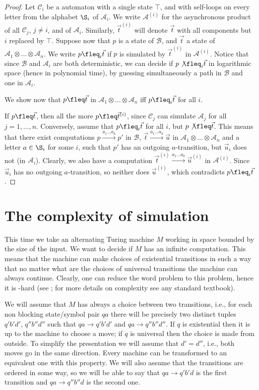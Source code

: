 \documentclass{LMCS}
\theoremstyle{plain}\newtheorem{remark}{Remark}
\theoremstyle{plain}\newtheorem{lemma}[thm]{Lemma}
\renewcommand{\Aa}{\mathcal{A}}
\renewcommand{\Bb}{\mathcal{B}}
\renewcommand{\Cc}{\mathcal{C}}
\newcommand{\vect}{\vec t}
\newcommand{\vecu}{\vec u}
\newcommand{\vAa}{\Aa_1\otimes\dots\otimes\Aa_n}
\newcommand{\trans}[1]{\stackrel{#1}{\longrightarrow}}
\begin{document}
\begin{proof}
  Let $\Cc_i$ be a automaton with a single state $\top$, and with
  self-loops on every letter from the alphabet $\S_i$ of $\Aa_i$. We
  write $\Aa^{(i)}$ for the asynchronous product of all $\Cc_j$, $j
  \not= i$, and of $\Aa_i$. Similarly, $\vect^{(i)}$ will denote $\vect$
with all components but $i$ replaced by $\top$.  Suppose now that $p$
is a state of $\Bb$, and $\vect$ a state of $\vAa$.  We write $p
\fleq_i \vect$ if $p$ is simulated by $\vect^{(i)}$ in $\Aa^{(i)}$.
 Notice that since $\Bb$ and $\Aa_i$ are both deterministic,
we can decide if $p \not\fleq_i \vect$ in logarithmic space (hence in
polynomial time), by guessing simultaneously a path in $\Bb$ and one
in $\Aa_i$.

  We show now that $p \fleq \vect$ in $\vAa$ iff $p \fleq_i \vect$ for
  all $i$.

  If $p \fleq \vect$, then all the more $p \fleq
  \vect^{(i)}$, since $\Cc_j$ can simulate $\Aa_j$ for all $j=1,\dots,n$.
  Conversely, assume that $p \fleq_i \vect$
  for all $i$, but  $p \not\fleq \vect$. This means that
  there exist computations $p \trans{a_1\ldots a_k} p'$ in $\Bb$,
  $\vect \trans{a_1\ldots a_k} \vecu$ in $\vAa$ and a letter $a
  \in\S_i$ for some $i$, such that $p'$ has an outgoing
  $a$-transition, but $\vecu_i$ does not (in $\Aa_i$). Clearly, we
  also have a computation $\vect^{(i)} \trans{a_1\ldots a_k}
  \vecu^{(i)}$ in $\Aa^{(i)}$. Since $\vecu_i$ has no outgoing
  $a$-transition, so neither does $\vecu^{(i)}$, which contradicts $p
  \fleq_i \vect$.
\end{proof}



\section{The complexity of simulation}

This time we take an alternating Turing machine $M$ working in space
bounded by the size of the input. We want to decide if $M$ has an
infinite computation.  This means that the machine can make choices of
existential transitions in such a way that no matter what are the
choices of universal transitions the machine can always
continue. Clearly, one can reduce the word problem to this problem,
hence it is \EXPTIME-hard (see \cite{cks81}; for more details on
complexity see any standard textbook).

We will assume that $M$ has always a choice between two transitions,
i.e., for each non blocking state/symbol pair $qa$ there will be precisely two 
distinct tuples
$q'b'd'$, $q''b''d''$ such that $qa\to q'b'd'$ and $qa\to
q''b''d''$. If $q$ is existential then it is up to the machine to choose
a move; if $q$ is universal then the choice is made from 
outside. To simplify the presentation we will assume that $d'=d''$,
i.e., both moves go in the same direction.  Every machine can be
transformed to an equivalent one with this property. We will also
assume that the transitions are ordered in some way, so we will be able
to say that $qa\to q'b'd$ is the first transition and $qa\to q''b''d$
is the second one.
\end{document}

